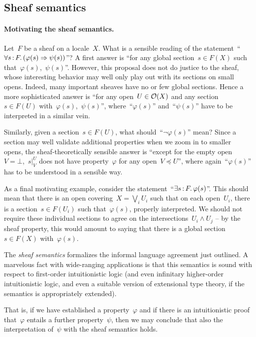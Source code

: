 \documentclass{ws-rv9x6}
\begin{document}
{\subsection{Sheaf semantics}
\label{sect:sheaf-semantics}

\paragraph{Motivating the sheaf semantics.} Let~$F$ be a sheaf on a locale~$X$.
What is a sensible reading of the statement~``$\forall s\,{:}\,F\mathpunct{.} (\varphi(s)
\Rightarrow \psi(s))$''? A first answer is ``for any global section~$s \in
F(X)$ such that~$\varphi(s)$,~$\psi(s)$''. However, this proposal does not do
justice to the sheaf, whose interesting behavior may well only play out with
its sections on small opens. Indeed, many important sheaves have no or few
global sections. Hence a more sophisticated answer is ``for any open~$U \in
\mathcal{O}(X)$ and any section~$s \in F(U)$ with~$\varphi(s)$,~$\psi(s)$'',
where~``$\varphi(s)$'' and~``$\psi(s)$'' have to be interpreted in a similar
vein.

Similarly, given a section~$s \in F(U)$, what should~``$\neg\varphi(s)$'' mean?
Since a section may well validate additional properties when we zoom in to
smaller opens, the sheaf-theoretically sensible answer is ``except for the
empty open~$V = \bot$,~$s|^U_V$ does not have property~$\varphi$ for any
open~$V \preceq U$'', where again~``$\varphi(s)$'' has to be understood in a
sensible way.

As a final motivating example, consider the statement~``$\exists s\,{:}\,F\mathpunct{.}
\varphi(s)$''. This should mean that there is an open covering~$X = \bigvee_i
U_i$ such that on each open~$U_i$, there is a section~$s \in F(U_i)$ such
that~$\varphi(s)$, properly interpreted. We should not require these individual
sections to agree on the intersections~$U_i \wedge U_j$ -- by the sheaf
property, this would amount to saying that there is a global section~$s \in
F(X)$ with~$\varphi(s)$.

The \emph{sheaf semantics} formalizes the informal language agreement just
outlined. A marvelous fact with wide-ranging applications is that this
semantics is sound with respect to first-order intuitionistic logic (and even
infinitary higher-order intuitionistic logic, and even a suitable version of
extensional type theory, if the semantics is appropriately extended).

That is, if we have established a property~$\varphi$ and if there is an
intuitionistic proof that~$\varphi$ entails a further property~$\psi$, then we
may conclude that also the interpretation of~$\psi$ with the sheaf semantics
holds.

}
\end{document}
